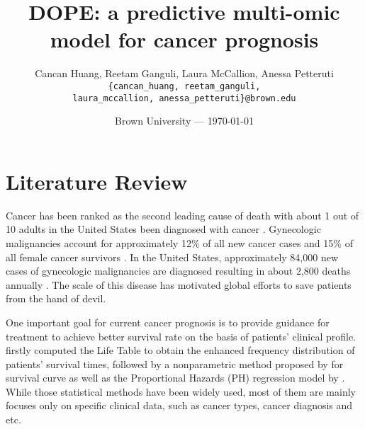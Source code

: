 \documentclass{article}
\title{DOPE: a predictive multi-omic model for cancer prognosis} %
\author{Cancan Huang, Reetam Ganguli, Laura McCallion, Anessa Petteruti\\ \texttt{\{cancan\_huang, reetam\_ganguli,} \\ \texttt{laura\_mccallion, anessa\_petteruti\}@brown.edu}} %
\date{Brown University --- \today} %
\begin{document}
\maketitle %

\vspace{-1cm}
\section*{Literature Review} %

Cancer has been ranked as the second leading cause of death with about 1 out of 10 adults in the United States been diagnosed with cancer \citep{aruleba2020applications,siegel2019cancer}. Gynecologic malignancies account for approximately 12\% of all new cancer cases and 15\% of all female cancer survivors \citep{salani2017update}. In the United States, approximately 84,000 new cases of gynecologic malignancies are diagnosed resulting in about 2,800 deaths annually \citep{stewart2013gynecologic}. The scale of this disease has motivated global efforts to save patients from the hand of devil.



One important goal for current cancer prognosis is to provide guidance for treatment to achieve better survival rate on the basis of patients' clinical profile.
\citet{rp1950calculation} firstly computed the Life Table to obtain the enhanced frequency distribution of patients' survival times, followed by a nonparametric method proposed by \citet{kaplan1958nonparametric} for survival curve as well as the Proportional Hazards (PH) regression model by \citet{cox1972regression}. While those statistical methods have been widely used, most of them are mainly focuses only on specific clinical data, such as cancer types, cancer diagnosis and etc.
\end{document}
